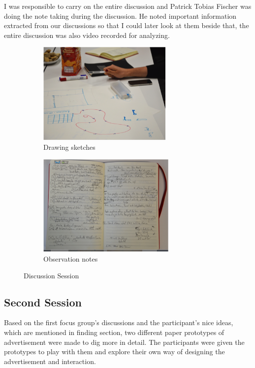 I was responsible to carry on the entire discussion and Patrick Tobias Fischer was doing the note taking during the discussion. He noted important information extracted from our discussions so that I could later look at them beside that, the entire discussion was also video recorded for analyzing.



\begin{figure}[H]
    \centering
    \begin{subfigure}[H]{0.45\textwidth}
        \centering
        \includegraphics[width=\textwidth,height=5cm]{Figures/4/drawings}
        \caption{Drawing sketches}
        \label{fig:focus_group}
    \end{subfigure}
    \begin{subfigure}[H]{0.45\textwidth}
        \centering
        \includegraphics[width=\textwidth,height=5cm]{Figures/4/notes}
        \caption{Observation notes}
        \label{fig:meeting_room}
    \end{subfigure}
    \caption{Discussion Session}
    \label{fig:observation_env_observation_note}
\end{figure}


\subsection{Second Session}
Based on the first focus group's discussions and the participant's nice ideas, which are mentioned in finding section, two different paper prototypes of advertisement were made to dig more in detail. The participants were given the prototypes to play with them and explore their own way of designing the advertisement and interaction.







